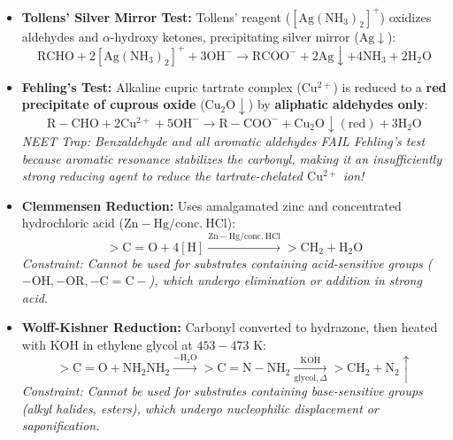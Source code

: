 \documentclass[10pt,twoside,openright]{book}
\begin{document}
\begin{usecasebox}
\begin{itemize}
  \item \textbf{Tollens' Silver Mirror Test:}
  Tollens' reagent ($[\mathrm{Ag(NH_3)_2}]^+$) oxidizes aldehydes and $\alpha$-hydroxy ketones, precipitating silver mirror ($\mathrm{Ag}\downarrow$):
  \begin{equation*}
    \mathrm{RCHO} + 2[\mathrm{Ag(NH_3)_2}]^+ + 3\mathrm{OH^-} \to \mathrm{RCOO^-} + 2\mathrm{Ag}\downarrow + 4\mathrm{NH_3} + 2\mathrm{H_2O}
  \end{equation*}
  \item \textbf{Fehling's Test:} Alkaline cupric tartrate complex ($\mathrm{Cu^{2+}}$) is reduced to a \textbf{red precipitate of cuprous oxide} ($\mathrm{Cu_2O}\downarrow$) by \textbf{aliphatic aldehydes only}:
  \begin{equation}
    \mathrm{R-CHO} + 2\mathrm{Cu^{2+}} + 5\mathrm{OH^-} \longrightarrow \mathrm{R-COO^-} + \mathbf{\mathrm{Cu_2O}}\downarrow (\text{red}) + 3\mathrm{H_2O}
  \end{equation}
  \textit{NEET Trap: Benzaldehyde and all aromatic aldehydes FAIL Fehling's test because aromatic resonance stabilizes the carbonyl, making it an insufficiently strong reducing agent to reduce the tartrate-chelated $\mathrm{Cu^{2+}}$ ion!}
\end{itemize}
\end{usecasebox}

\begin{formulabox}
\begin{itemize}
  \item \textbf{Clemmensen Reduction:} Uses amalgamated zinc and concentrated hydrochloric acid ($\mathrm{Zn-Hg / conc.\ HCl}$):
  \begin{equation}
    >\mathrm{C=O} + 4[\mathrm{H}] \xrightarrow{\mathrm{Zn-Hg / conc.\ HCl}} >\mathbf{\mathrm{CH_2}} + \mathrm{H_2O}
  \end{equation}
  \textit{Constraint: Cannot be used for substrates containing acid-sensitive groups ($-\mathrm{OH}, -\mathrm{OR}, -\mathrm{C=C}-$), which undergo elimination or addition in strong acid.}
  \item \textbf{Wolff-Kishner Reduction:} Carbonyl converted to hydrazone, then heated with $\mathrm{KOH}$ in ethylene glycol at $453-473\text{ K}$:
  \begin{equation}
    >\mathrm{C=O} + \mathrm{NH_2NH_2} \xrightarrow{-\mathrm{H_2O}} >\mathrm{C=N-NH_2} \xrightarrow[\text{glycol}, \Delta]{\mathrm{KOH}} >\mathbf{\mathrm{CH_2}} + \mathrm{N_2}\uparrow
  \end{equation}
  \textit{Constraint: Cannot be used for substrates containing base-sensitive groups (alkyl halides, esters), which undergo nucleophilic displacement or saponification.}
\end{itemize}
\end{formulabox}
\end{document}
